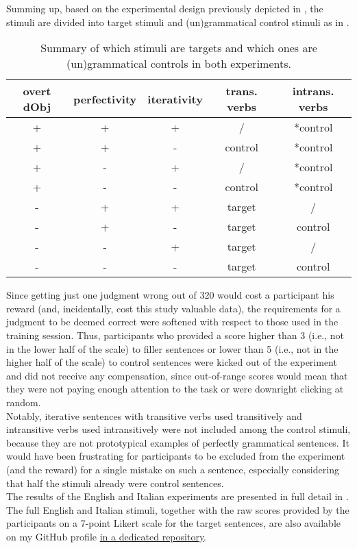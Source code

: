 Summing up, based on the experimental design previously depicted in , the stimuli are divided into target stimuli and (un)grammatical control stimuli as in .

\begin{table}[htb] %
\caption{Summary of which stimuli are targets and which ones are (un)grammatical controls in both experiments.}
\begin{tabular}{ccc|cc}
overt dObj & perfectivity & iterativity & trans. verbs & intrans. verbs \\
\hline
+          & +            & + & / & *control           \\
+          & +            & - & control & *control         \\
+          & -            & + & / & *control           \\
+          & -            & - & control & *control        \\
\hline
-          & +            & + & target & /          \\
-          & +            & - & target & control          \\
-          & -            & + & target & /          \\
-          & -            & - & target & control          
\end{tabular}
\end{table}

Since getting just one judgment wrong out of 320 would cost a participant his reward (and, incidentally, cost this study valuable data), the requirements for a judgment to be deemed correct were softened with respect to those used in the training session. Thus, participants who provided a score higher than 3 (i.e., not in the lower half of the scale) to filler sentences or lower than 5 (i.e., not in the higher half of the scale) to control sentences were kicked out of the experiment and did not receive any compensation, since out-of-range scores would mean that they were not paying enough attention to the task or were downright clicking at random.\\ Notably, iterative sentences with transitive verbs used transitively and intransitive verbs used intransitively were not included among the control stimuli, because they are not prototypical examples of perfectly grammatical sentences. It would have been frustrating for participants to be excluded from the experiment (and the reward) for a single mistake on such a sentence, especially considering that half the stimuli already were control sentences.\\
The results of the English and Italian experiments are presented in full detail in . The full English and Italian stimuli, together with the raw scores provided by the participants on a 7-point Likert scale for the target sentences, are also available on my GitHub profile \href{https://github.com/giuliacappelli/dissertationData}{in a dedicated repository}.

